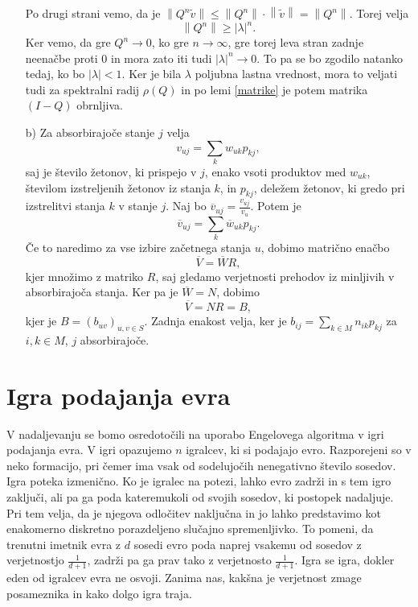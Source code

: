 \documentclass[twoside,11pt]{article}
\begin{document}
\begin{enumerate}
\[\]
Po drugi strani vemo, da je $\left\lVert Q^n\widetilde{v} \right\rVert\leq \left\lVert Q^n \right\rVert \cdot \left\lVert \widetilde{v} \right\rVert = \left\lVert Q^n \right\rVert$.
Torej velja
$$ \left\lVert Q^n \right\rVert \geq \left\lvert \lambda\right\rvert^n.$$
Ker vemo, da gre $Q^n \rightarrow 0$, ko gre $n \rightarrow \infty$, gre torej leva stran zadnje neenačbe proti 0 in mora zato iti tudi $\left\lvert \lambda \right\rvert^n \rightarrow 0$. To pa se bo zgodilo natanko tedaj, ko bo $\left\lvert \lambda \right\rvert < 1$. Ker je bila $\lambda$ poljubna lastna vrednost, mora to veljati tudi za spektralni radij $\rho(Q)$ in po lemi \ref{matrike} je potem matrika $(I-Q)$ obrnljiva.

\item[b)] Za absorbirajoče stanje $j$ velja
$$v_{uj} = \sum_{k} w_{uk}p_{kj},$$
saj je število žetonov, ki prispejo v $j$, enako vsoti produktov med $w_{uk}$, številom izstreljenih žetonov iz stanja $k$, in $p_{kj}$, deležem žetonov, ki gredo pri izstrelitvi stanja $k$ v stanje $j$. \newline
Naj bo $\overline{v}_{uj} = \frac{v_{uj}}{v_{u}}$. Potem je
$$ \overline{v}_{uj} = \sum_{k} \overline{w}_{uk}p_{kj}.$$
Če to naredimo za vse izbire začetnega stanja $u$, dobimo matrično enačbo
$$\overline{V} = \overline{W}R,$$
kjer množimo z matriko $R$, saj gledamo verjetnosti prehodov iz minljivih v absorbirajoča stanja.
Ker pa je $\overline{W} = N$, dobimo 
$$\overline{V} = NR = B, $$
kjer je $B = (b_{uv})_{u,v \in S}$. Zadnja enakost velja, ker je $b_{ij} = \sum_{k\in M} n_{ik}p_{kj}$ za $i,k \in M$, $j$ absorbirajoče.

\hfill \QED
\end{enumerate}


\section{Igra podajanja evra}
V nadaljevanju se bomo osredotočili na uporabo Engelovega algoritma v igri podajanja evra. V igri opazujemo $n$ 
igralcev, ki si podajajo evro. Razporejeni so v neko formacijo, pri čemer ima vsak od sodelujočih nenegativno število sosedov. Igra poteka izmenično. 
Ko je igralec na potezi, lahko evro zadrži in s tem igro zaključi, ali pa ga poda kateremukoli od svojih sosedov, ki postopek nadaljuje. Pri tem velja, da je njegova odločitev naključna in jo lahko predstavimo kot enakomerno diskretno porazdeljeno slučajno spremenljivko. To pomeni, da trenutni imetnik evra z $d$ sosedi evro poda naprej vsakemu od sosedov
z verjetnostjo $\frac{1}{d+1}$, zadrži pa ga prav tako z verjetnosto $\frac{1}{d+1}$. Igra se igra, dokler eden od igralcev evra ne osvoji. Zanima nas, kakšna je verjetnost zmage posameznika in kako dolgo igra traja.
\end{document}
